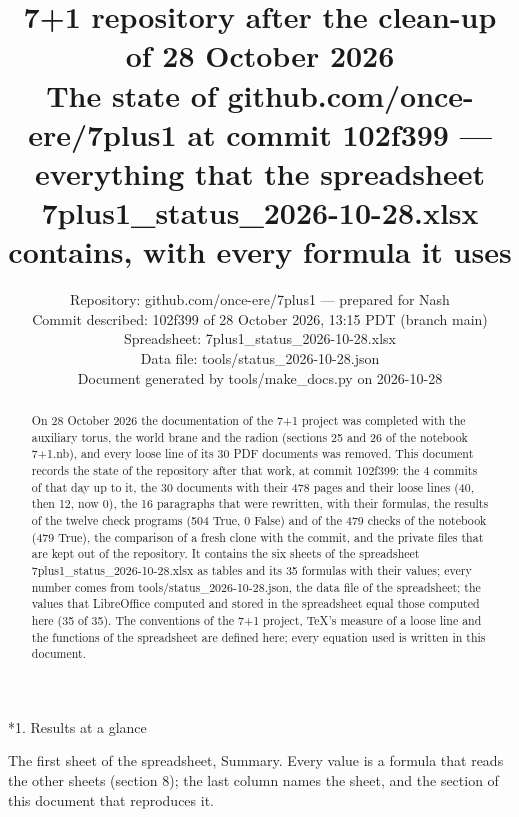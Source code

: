 \documentclass[10pt,a4paper]{article}
\makeatletter
\renewcommand\section{\@startsection{section}{1}{\z@}{-3.5ex \@plus -1ex \@minus -.2ex}{2.3ex \@plus.2ex}{\normalfont\Large\bfseries\raggedright}}
\makeatother
\begin{document}
\title{7+1 repository after the clean-up of 28 October 2026\\[0.4em]\large The state of github.com/once-ere/7plus1 at commit 102f399 — everything that the spreadsheet 7plus1\_status\_2026-10-28.xlsx contains, with every formula it uses}
\author{Repository: github.com/once-ere/7plus1 — prepared for Nash\\ Commit described: 102f399 of 28 October 2026, 13:15 PDT (branch main)\\ Spreadsheet: 7plus1\_status\_2026-10-28.xlsx\\ Data file: tools/status\_2026-10-28.json\\ Document generated by tools/make\_docs.py on 2026-10-28}
\date{}
\maketitle
\begin{abstract}
On 28 October 2026 the documentation of the 7+1 project was completed with the auxiliary torus, the world brane and the radion (sections 25 and 26 of the notebook 7+1.nb), and every loose line of its 30 PDF documents was removed. This document records the state of the repository after that work, at commit 102f399: the 4 commits of that day up to it, the 30 documents with their 478 pages and their loose lines (40, then 12, now 0), the 16 paragraphs that were rewritten, with their formulas, the results of the twelve check programs (504 True, 0 False) and of the 479 checks of the notebook (479 True), the comparison of a fresh clone with the commit, and the private files that are kept out of the repository. It contains the six sheets of the spreadsheet 7plus1\_status\_2026-10-28.xlsx as tables and its 35 formulas with their values; every number comes from tools/status\_2026-10-28.json, the data file of the spreadsheet; the values that LibreOffice computed and stored in the spreadsheet equal those computed here (35 of 35). The conventions of the 7+1 project, TeX’s measure of a loose line and the functions of the spreadsheet are defined here; every equation used is written in this document.
\end{abstract}
\tableofcontents
{}\section*{1. Results at a glance}
The first sheet of the spreadsheet, Summary. Every value is a formula that reads the other sheets (section 8); the last column names the sheet, and the section of this document that reproduces it.
\end{document}
